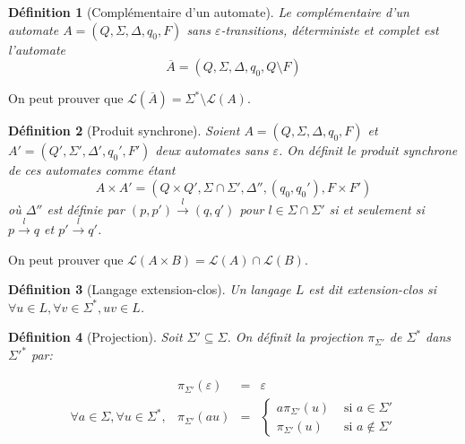 \documentclass[conference]{IEEEtran}
\newtheorem{mydef}{D\'efinition}
\begin{document}
\begin{mydef}[Compl\'ementaire d'un automate]
Le compl\'ementaire d'un automate $A = (Q, \Sigma, \Delta, q_0, F)$ sans $\varepsilon$-transitions, d\'eterministe et complet est l'automate $$\overline{A} = (Q, \Sigma, \Delta, q_0, Q\setminus F)$$
\end{mydef}

On peut prouver que $\mathcal L\left(\overline{A}\right) = \Sigma^* \setminus \mathcal L(A)$.

\begin{mydef}[Produit synchrone]
Soient $A = (Q, \Sigma, \Delta, q_0, F)$ et $A' = (Q', \Sigma', \Delta', q_0', F')$ deux automates sans $\varepsilon$. On définit le produit synchrone de ces automates comme \'etant $$A\times A' = (Q \times Q', \Sigma \cap \Sigma', \Delta'', (q_0, q_0'), F\times F')$$ o\`u $\Delta''$ est d\'efinie par $(p,p')\overset{l}{{\to}}(q,q')$ pour $l\in \Sigma\cap \Sigma'$ si et seulement si $p\overset{l}{{\to}}q$ et $p'\overset{l}{{\to}}q'$.
\end{mydef}
On peut prouver que $\mathcal L(A\times B) = \mathcal L(A) \cap \mathcal L(B)$.

\begin{mydef}[Langage extension-clos]
Un langage $L$ est dit extension-clos si $\forall u \in L, \forall v \in \Sigma^*, uv \in L$.
\end{mydef}

\begin{mydef}[Projection]
Soit $\Sigma'\subseteq \Sigma$. On d\'efinit la projection $\pi_{\Sigma'}$ de $\Sigma^*$ dans $\Sigma'^*$ par:

$$\begin{array}{llll}
&\pi_{\Sigma'}(\varepsilon) &= &\varepsilon\\
\forall a \in \Sigma, \forall u \in \Sigma^*, &\pi_{\Sigma'}(au) &= &\left\{\begin{array}{ll}
a\pi_{\Sigma'}(u) &\text{ si } a \in \Sigma'\\
\pi_{\Sigma'}(u) &\text{ si } a \not\in \Sigma'
\end{array}\right.
\end{array}$$
\end{mydef}
\end{document}
